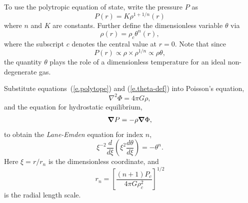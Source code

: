 To use the polytropic equation of state, write the pressure $P$ as
\begin{equation}\label{e.polytope}
P(r) = K\rho^{1+1/n}(r)
\end{equation}
where $n$ and $K$ are constants. Further define the dimensionless variable $\theta$ via
\begin{equation}\label{e.theta-def}
\rho(r) = \rho_{c}\theta^{n}(r),
\end{equation}
where the subscript $c$ denotes the central value at $r=0$. Note that since
\[ P(r) \propto \rho \times \rho^{1/n} \propto \rho \theta, \]
the quantity $\theta$ plays the role of a dimensionless temperature for an ideal non-degenerate gas.

Substitute equations~(\ref{e.polytope}) and (\ref{e.theta-def}) into Poisson's equation,
\begin{equation}
\nabla^{2}\Phi = 4\pi G\rho,
\end{equation}
and the equation for hydrostatic equilibrium, 
\begin{equation}
\boldsymbol{\nabla} P = -\rho\boldsymbol{\nabla} \Phi,
\end{equation}
to obtain the \emph{Lane-Emden} equation for index $n$,
\begin{equation}\label{e.LE}
\xi^{-2} \frac{d}{d\xi}\left(\xi^{2}\frac{d\theta}{d\xi}\right) = -\theta^{n}.
\end{equation}
Here $\xi = r/r_{n}$ is the dimensionless coordinate, and
\begin{equation}\label{e.LE-length-scale}
r_{n} = \left[\frac{(n+1)P_{c}}{4\pi G\rho_{c}^{2}}\right]^{1/2}
\end{equation}
is the radial length scale.


